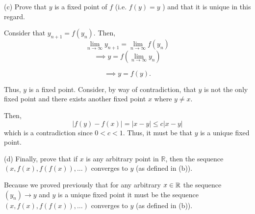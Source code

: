 \documentclass{report}
\begin{document}
\par
\bigskip
(c) Prove that $y$ is a fixed point of $f$ (i.e. $f(y)=y$ ) and that it is unique in this regard.

\par

\begin{myproof}
    
\bigskip
Consider that $y_{n+1} = f(y_n).$ Then, $$ \lim_{n \rightarrow \infty} y_{n+1} = \lim_{n \rightarrow \infty}f(y_n)$$
$$\implies y=  f\left(\lim_{n \rightarrow \infty}y_n\right)$$

$$\implies  y = f(y).$$

Thus, $y$ is a fixed point. Consider, by way of contradiction, that $y$ is not the only fixed point and there exists another fixed point $x$ where $y\not=x.$

Then, $$|f(y) - f(x)| = |x-y| \leq c|x-y|$$ which is a contradiction since $0 < c < 1$. Thus, it must be that $y$ is a unique fixed point.

\end{myproof}
\bigskip
(d) Finally, prove that if $x$ is any arbitrary point in $\mathbb{R}$, then the sequence $(x, f(x), f(f(x)), \ldots)$ converges to $y$ (as defined in (b)).

\begin{myproof}
Because we proved previously that for any arbitrary $x \in \RR$ the sequence $(y_n) \rightarrow y$ and $y$ is a unique fixed point it must be the sequence $(x, f(x), f(f(x)), \ldots)$ converges to $y$ (as defined in (b)).
\end{myproof}

\pagebreak
{}
\end{document}
